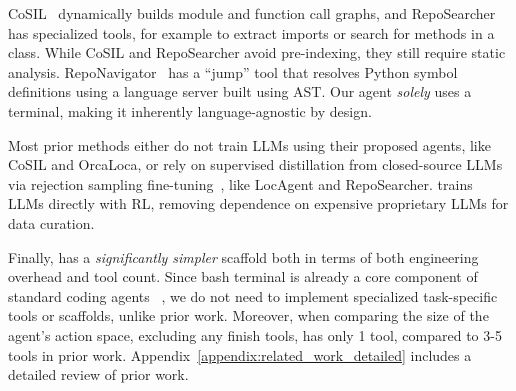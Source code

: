 CoSIL~\citep{jiang2025issuelocalizationllmdriveniterative} dynamically builds module and function call graphs, and RepoSearcher~\citep{ma2025toolintegratedreinforcementlearningrepo} has specialized tools, for example to extract imports or search for methods in a class. While CoSIL and RepoSearcher avoid pre-indexing, they still require static analysis. RepoNavigator~\citep{zhang2025one} has a ``jump'' tool that resolves Python symbol definitions using a language server built using AST. Our agent \emph{solely} uses a terminal, making it inherently language-agnostic by design.

% 
Most prior methods either do not train LLMs using their proposed agents, like CoSIL and OrcaLoca, or rely on supervised distillation from closed-source LLMs via rejection sampling fine-tuning~\citep{yuan2023scalingrelationshiplearningmathematical}, like LocAgent and RepoSearcher. \methodname trains LLMs directly with RL, removing dependence on expensive proprietary LLMs for data curation.

Finally, \methodname has a \emph{significantly simpler} scaffold both in terms of both engineering overhead and tool count. Since bash terminal is already a core component of standard coding agents ~\citep{wang2025openhandssoftwareagentsdk, yang2024sweagentagentcomputerinterfacesenable, anthropic_claude_code_2025}, we do not need to implement specialized task-specific tools or scaffolds, unlike prior work. Moreover, when comparing the size of the agent's action space, excluding any finish tools, \methodname has only 1 tool, compared to 3-5 tools in prior work. Appendix~\ref{appendix:related_work_detailed} includes a detailed review of prior work.



